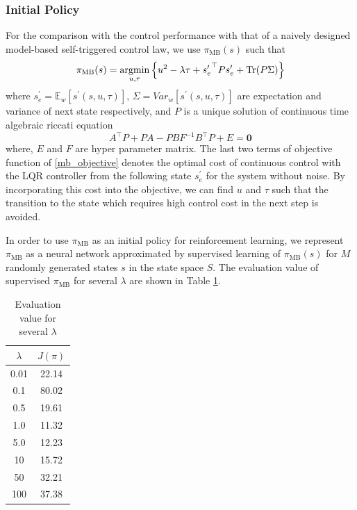 \documentclass[english, dvipdfmx]{ampmt}             %
\newcommand{\argmin}{\mathop{\rm argmin}\limits}
\newcommand{\expect}{\mathbb{E}}
\begin{document}
\subsubsection{Initial Policy}
For the comparison with the control performance with that of a naively designed model-based self-triggered control law, we use $\pi_{\textrm{MB}}(s)$ such that
\begin{equation}
	\pi_{\textrm{MB}}(s) = \argmin_{u,\tau} \left\{u^2 - \lambda\tau + {s^{\prime}_e}^{\top}Ps^{\prime} _e+ \textrm{Tr}(P\Sigma)\right\} \label{mb_objective}
\end{equation}
where $s^{\prime}_e=\expect_{w}[s^{\prime}(s,u,\tau)]$, $\Sigma=Var_w[s^{\prime}(s,u,\tau)]$ are  expectation and variance of next state respectively, and $P$ is a unique solution of continuous time algebraic riccati equation
\begin{equation}
	A^{\top}P + PA - PBF^{-1}B^{\top}P + E = \bm{0}
\end{equation}
where, $E$ and $F$ are hyper parameter matrix. The last two terms of objective function of \eqref{mb_objective} denotes the optimal cost of continuous control with the LQR controller from the following state $s^{\prime}_e$ for the system without noise. By incorporating this cost into the objective, we can find $u$ and $\tau$ such that the transition to the state which requires high control cost in the next step is avoided.\par 
In order to use $\pi_{\textrm{MB}}$ as an initial policy for reinforcement learning, we represent $\pi_{\textrm{MB}}$ as a neural network approximated by supervised learning of $\pi_{\textrm{MB}}(s)$ for $M$ randomly generated states $s$ in the state space $S$. The evaluation value of supervised $\pi_{\textrm{MB}}$ for several $\lambda$ are shown in Table \ref{ev}.
\begin{table}[htb]
  \begin{center}
    \begin{tabular}{|cc|} \hline
      $\lambda$ & $J(\pi)$ \\ \hline 
      0.01 & 22.14 \\
      0.1 & 80.02 \\ %
      0.5 & 19.61 \\
      1.0 & 11.32 \\
      5.0 & 12.23 \\
      10 & 15.72 \\
      50 & 32.21 \\
      100 & 37.38 \\ \hline
    \end{tabular}
    \caption{Evaluation value for several $\lambda$}
    \label{ev}
  \end{center}
\end{table}
\end{document}
